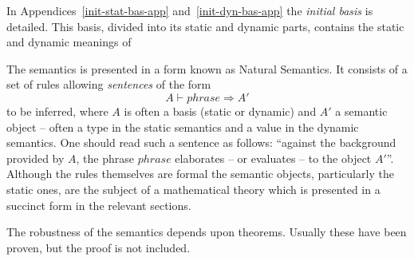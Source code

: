 In Appendices~\ref{init-stat-bas-app} and~\ref{init-dyn-bas-app}
the {\sl initial basis} is detailed.  This basis,
divided into its static and dynamic parts, contains the static and
dynamic meanings of 

The semantics is presented in a form  known as Natural
Semantics.  It consists of a set of rules allowing
{\sl sentences} of the form
\[ A \vdash phrase \Rightarrow A' \]
to be inferred, where $A$ is often a basis (static or dynamic) and $A'$ a
semantic object
-- often a type in the static semantics and a value in the dynamic
semantics. One should read such a sentence as follows: ``against
the background provided by
$A$, the phrase $phrase$ elaborates -- or evaluates -- to the object
$A'$''.
Although the rules themselves are formal the semantic
objects, particularly the static ones, are the subject of a mathematical
theory which is presented in a succinct form in the relevant sections.

The robustness of the semantics depends upon theorems.
Usually these have been proven, but the proof is not included.
